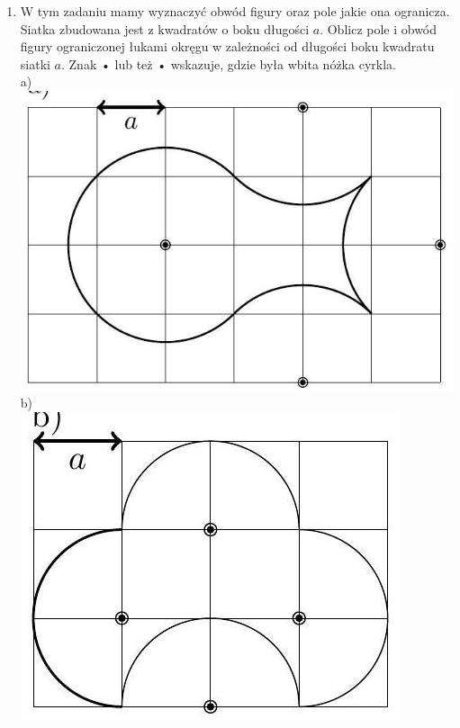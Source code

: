 \documentclass[10pt]{article}
\begin{document}
\begin{enumerate}
  \item W tym zadaniu mamy wyznaczyć obwód figury oraz pole jakie ona ogranicza. Siatka zbudowana jest z kwadratów o boku długości \(a\). Oblicz pole i obwód figury ograniczonej łukami okręgu w zależności od długości boku kwadratu siatki \(a\). Znak • lub też • wskazuje, gdzie była wbita nóżka cyrkla.\\
a)\\
\includegraphics[max width=\textwidth, center]{2024_11_21_e9b4faa005d5be2cc318g-060(2)}\\
b)\\
\includegraphics[max width=\textwidth, center]{2024_11_21_e9b4faa005d5be2cc318g-060}\\

\end{enumerate}
\end{document}

